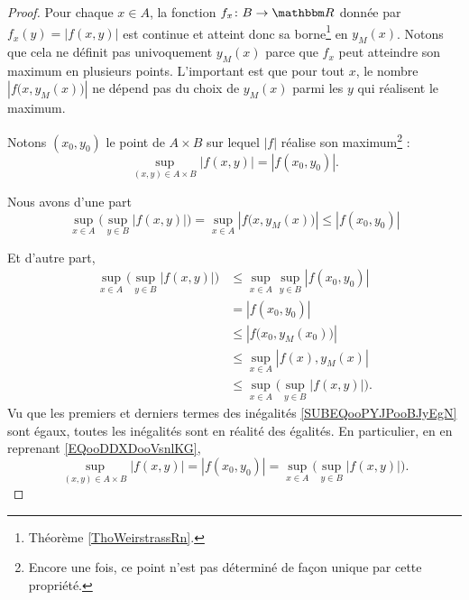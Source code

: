 \begin{proof}
    Pour chaque \( x\in A \), la fonction \( f_x\colon B\to \eR\) donnée par \( f_x(y)=| f(x,y) |\) est continue et atteint donc sa borne\footnote{Théorème \ref{ThoWeirstrassRn}.} en \( y_M(x)\). Notons que cela ne définit pas univoquement \( y_M(x)\) parce que \( f_x\) peut atteindre son maximum en plusieurs points. L'important est que pour tout \( x\), le nombre \( | f\big( x,y_M(x) \big) |\) ne dépend pas du choix de \( y_M(x)\) parmi les \( y\) qui réalisent le maximum.


    Notons \( (x_0,y_0)\) le point de \( A\times B\) sur lequel \( | f |\) réalise son maximum\footnote{Encore une fois, ce point n'est pas déterminé de façon unique par cette propriété.} :
    \begin{equation}        \label{EQooDDXDooVsnlKG}
        \sup_{(x,y)\in A\times B}| f(x,y) |=| f(x_0,y_0) |.
    \end{equation}
    

    Nous avons d'une part
    \begin{equation}
        \sup_{x\in A}\big( \sup_{y\in B}| f(x,y) | \big)=\sup_{x\in A}| f\big( x,y_M(x) \big) |\leq | f(x_0,y_0) |
    \end{equation}

    Et d'autre part,
    \begin{subequations}        \label{SUBEQooPYJPooBJyEgN}
        \begin{align}
            \sup_{x\in A}\big( \sup_{y\in B}| f(x,y) | \big)&\leq \sup_{x\in A}\sup_{y\in B}| f(x_0,y_0) |\\
            &=| f(x_0,y_0) |\\
            &\leq | f\big(x_0,y_M(x_0)\big) |\\
            &\leq \sup_{x\in A}| f(x),y_M(x) |\\
            &\leq \sup_{x\in A}\big( \sup_{y\in B}| f(x,y) | \big).
        \end{align}
    \end{subequations}
    Vu que les premiers et derniers termes des inégalités \eqref{SUBEQooPYJPooBJyEgN} sont égaux, toutes les inégalités sont en réalité des égalités. En particulier, en en reprenant \eqref{EQooDDXDooVsnlKG},
    \begin{equation}
        \sup_{(x,y)\in A\times B}| f(x,y) |=| f(x_0,y_0) |=\sup_{x\in A}\big( \sup_{y\in B}| f(x,y) | \big).
    \end{equation}
\end{proof}

